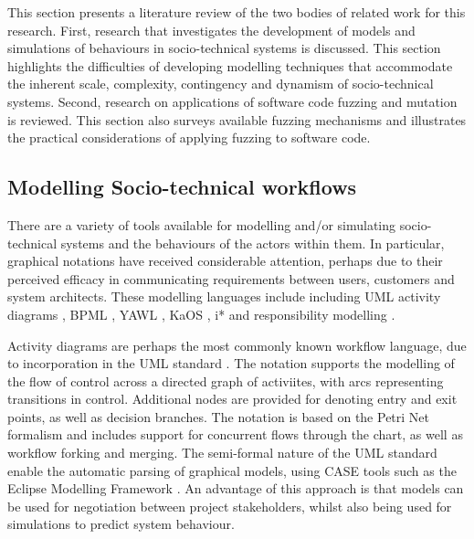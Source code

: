 \documentclass{sig-alternate}
\begin{document}
\label{sec:related}


This section presents a literature review of the two bodies of related work for
this research.  First, research that investigates the development of models and
simulations of behaviours in socio-technical systems is discussed.  This section
highlights the difficulties of developing modelling techniques that accommodate
the inherent scale, complexity, contingency and dynamism of socio-technical
systems.  Second, research on applications of software code fuzzing and mutation
is reviewed.  This section also surveys available fuzzing mechanisms and
illustrates the practical considerations of applying fuzzing to software code.


\subsection{Modelling Socio-technical workflows}

There are a variety of tools available for modelling and/or simulating
socio-technical systems and the behaviours of the actors within them.  In
particular, graphical notations have received considerable attention, perhaps
due to their perceived efficacy in communicating requirements between users,
customers and system architects.  These modelling languages include including
UML activity diagrams \citep{omg2010omguml}, BPML \cite{White2004}, YAWL
\citep{hofstede2010yawl}, KaOS \citep{Werneck2009}, i* \citep{Yu1995} and
responsibility modelling \cite{sommerville09responsibility}.

Activity diagrams are perhaps the most commonly known workflow language, due to
incorporation in the UML standard \citep{omg2010omguml}.  The notation supports
the modelling of the flow of control across a directed graph of activiites, with
arcs representing transitions in control.  Additional nodes are provided for
denoting entry and exit points, as well as decision branches.  The notation is
based on the Petri Net formalism and includes support for concurrent flows
through the chart, as well as workflow forking and merging. The semi-formal
nature of the UML standard enable the automatic parsing of graphical models,
using CASE tools such as the Eclipse Modelling Framework \citep{EMFManual}.  An
advantage of this approach is that models can be used for negotiation between
project stakeholders, whilst also being used for simulations to predict system
behaviour.
\end{document}
